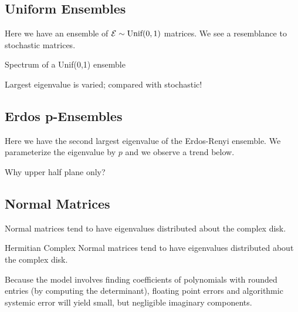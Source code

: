 \subsection{Uniform Ensembles}
Here we have an ensemble of $\mathcal{E} \sim \text{Unif}(0,1)$ matrices. We see a resemblance to
stochastic matrices.

{Spectrum of a Unif(0,1) ensemble}

Largest eigenvalue is varied; compared with stochastic!

\newpage

\subsection{Erdos p-Ensembles}

Here we have the second largest eigenvalue of the Erdos-Renyi ensemble. We parameterize the eigenvalue by $p$ and we observe a trend below.



Why upper half plane only?

\newpage
\subsection{Normal Matrices}

Normal matrices tend to have eigenvalues distributed about the complex disk.



Hermitian Complex Normal matrices tend to have eigenvalues distributed about the complex disk.

\begin{remark}
Because the model involves finding coefficients of polynomials with rounded entries (by computing the determinant),
floating point errors and algorithmic systemic error will yield small, but negligible imaginary components.
\end{remark}

